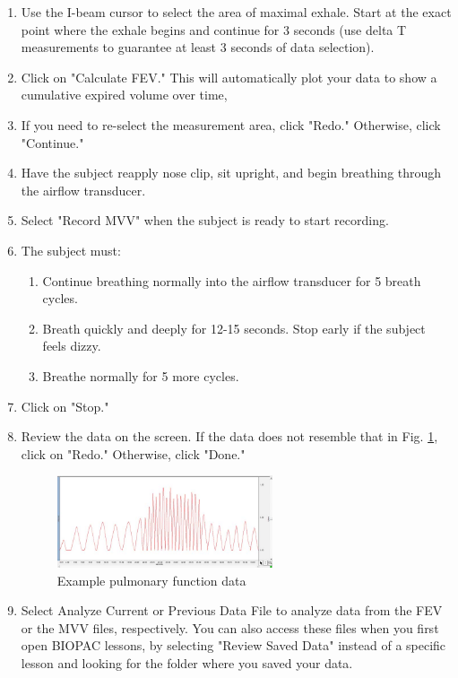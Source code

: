 \documentclass{article}
\begin{document}
\begin{enumerate}
	\item Use the I-beam cursor to select the area of maximal exhale. Start at the exact point where the exhale begins and continue for 3 seconds (use delta T measurements to guarantee at least 3 seconds of data selection).
	\item Click on "Calculate FEV." This will automatically plot your data to show a cumulative expired volume over time,
	\item If you need to re-select the measurement area, click "Redo." Otherwise, click "Continue."
	\item Have the subject reapply nose clip, sit upright, and begin breathing through the airflow transducer.
	\item Select "Record MVV" when the subject is ready to start recording.
	\item The subject must:\begin{enumerate}
		\item Continue breathing normally into the airflow transducer for 5 breath cycles.
		\item Breath quickly and deeply for 12-15 seconds. Stop early if the subject feels dizzy.
		\item Breathe normally for 5 more cycles.
	\end{enumerate}
	
	\item Click on "Stop."
	\item Review the data on the screen. If the data does not resemble that in Fig. \ref{example_3}, click on "Redo." Otherwise, click "Done."
	\begin{figure}[h]
	\centering\includegraphics[width=0.6\textwidth]{../images/PF_I_8.jpg}
		\caption{Example pulmonary function data}
		\label{example_3}
		\end{figure}

	\item Select Analyze Current or Previous Data File to analyze data from the FEV or the MVV files, respectively. You can also access these files when you first open BIOPAC lessons, by selecting "Review Saved Data" instead of a specific lesson and looking for the folder where you saved your data.
\end{enumerate}
\end{document}
